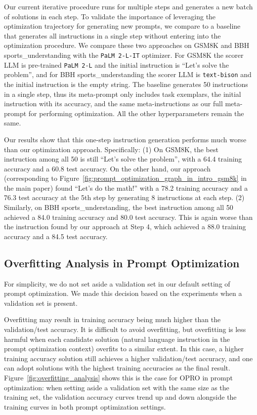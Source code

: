 Our current iterative procedure runs for multiple steps and generates a new batch of solutions in each step.
To validate the importance of leveraging the optimization trajectory for generating new prompts, we compare to a baseline that generates all instructions in a single step without entering into the optimization procedure.
We compare these two approaches on GSM8K and BBH sports\_understanding with the \texttt{PaLM 2-L-IT} optimizer. 
For GSM8K the scorer LLM is pre-trained \texttt{PaLM 2-L} and the initial instruction is “Let’s solve the problem”, and for BBH sports\_understanding the scorer LLM is \texttt{text-bison} and the initial instruction is the empty string. 
The baseline generates 50 instructions in a single step, thus its meta-prompt only includes task exemplars, the initial instruction with its accuracy, and the same meta-instructions as our full meta-prompt for performing optimization. 
All the other hyperparameters remain the same.

Our results show that this one-step instruction generation performs much worse than our optimization approach. Specifically:
(1) On GSM8K, the best instruction among all 50 is still ``Let's solve the problem'', with a 64.4 training accuracy and a 60.8 test accuracy. On the other hand, our approach (corresponding to Figure~\ref*{fig:prompt_optimization_graph_in_intro_gsm8k} in the main paper) found ``Let’s do the math!'' with a 78.2 training accuracy and a 76.3 test accuracy at the 5th step by generating 8 instructions at each step.
(2) Similarly, on BBH sports\_understanding, the best instruction among all 50 achieved a 84.0 training accuracy and 80.0 test accuracy. This is again worse than the instruction found by our approach at Step 4, which achieved a 88.0 training accuracy and a 84.5 test accuracy.

\subsection{Overfitting Analysis in Prompt Optimization}
\label{sec:overfitting_analysis_in_prompt_optimization}
For simplicity, we do not set aside a validation set in our default setting of prompt optimization.
We made this decision based on the experiments when a validation set is present.

Overfitting may result in training accuracy being much higher than the validation/test accuracy.
It is difficult to avoid overfitting, but overfitting is less harmful when each candidate solution (natural language instruction in the prompt optimization context) overfits to a similar extent.
In this case, a higher training accuracy solution still achieves a higher validation/test accuracy, and one can adopt solutions with the highest training accuracies as the final result.
Figure~\ref{fig:overfitting_analysis} shows this is the case for OPRO in prompt optimization: when setting aside a validation set with the same size as the training set, the validation accuracy curves trend up and down alongside the training curves in both prompt optimization settings.

